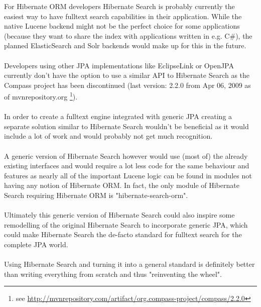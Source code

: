 For Hibernate ORM developers Hibernate Search is probably currently the easiest way to have fulltext search capabilities in their application. While the native Lucene backend might not be the perfect choice for some applications (because they want to share the index with applications written in e.g. C\#), the planned ElasticSearch and Solr backends would make up for this in the future.
\\\\
Developers using other JPA implementations like EclipseLink or OpenJPA currently don't have the option to use a similar API to Hibernate Search as the Compass project has been discontinued (last version: 2.2.0 from Apr 06, 2009 as of mvnrepository.org \footnote{see \url{http://mvnrepository.com/artifact/org.compass-project/compass/2.2.0}}).
\\\\
In order to create a fulltext engine integrated with generic JPA creating a separate solution similar to Hibernate Search wouldn't be beneficial as it would include a lot of work and would probably not get much recognition.
\\\\
A generic version of Hibernate Search however would use (most of) the already existing interfaces and would require a lot less code for the same behaviour and features as nearly all of the important Lucene logic can be found in modules not having any notion of Hibernate ORM. In fact, the only module of Hibernate Search requiring Hibernate ORM is "hibernate-search-orm".
\\\\
Ultimately this generic version of Hibernate Search could also inspire some remodelling of the original Hibernate Search to incorporate generic JPA, which could make Hibernate Search the de-facto standard for fulltext search for the complete JPA world.
\\\\
Using Hibernate Search and turning it into a general standard is definitely better than writing everything from scratch and thus "reinventing the wheel". \label{reinvent_the_wheel}

\pagebreak